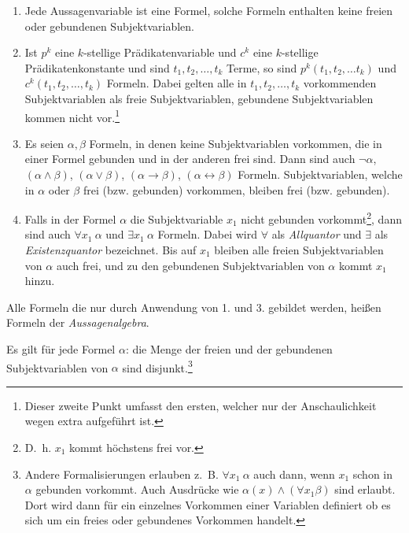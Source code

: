 \documentclass[a4paper,german,10pt,twoside]{book}
\theoremstyle{definition}
\theoremstyle{remark}
\begin{document}
\begin{enumerate}

\item Jede Aussagenvariable ist eine Formel, solche Formeln enthalten keine freien oder gebundenen Subjektvariablen. 
\item Ist $p^k$ eine $k$-stellige Pr{\"a}dikatenvariable und $c^k$ eine $k$-stellige Pr{\"a}dikatenkonstante und sind $t_1, t_2, \ldots, t_k$ Terme, so sind $p^k(t_1, t_2, \ldots t_k)$ und $c^k(t_1, t_2, \ldots, t_k)$ Formeln. Dabei gelten alle in 
$t_1, t_2, \ldots, t_k$ vorkommenden Subjektvariablen als freie Subjektvariablen, gebundene Subjektvariablen kommen nicht 
vor.\footnote{Dieser zweite Punkt umfasst den ersten, welcher nur der Anschaulichkeit wegen extra aufgef{\"u}hrt ist.} 

\item Es seien $\alpha, \beta$ Formeln, in denen keine Subjektvariablen vorkommen, die in einer Formel gebunden und in der anderen frei sind. Dann sind auch $\neg \alpha$, $(\alpha \land \beta)$, $(\alpha \lor \beta)$, $(\alpha \rightarrow \beta)$, $(\alpha \leftrightarrow \beta)$ Formeln. Subjektvariablen, welche in $\alpha$ oder $\beta$ frei (bzw. gebunden) vorkommen, bleiben frei (bzw. gebunden).

\item Falls in der Formel $\alpha$ die Subjektvariable $x_1$ nicht gebunden vorkommt\footnote{D.~h. $x_1$ kommt h{\"o}chstens frei vor.}, dann sind auch $\forall x_1~\alpha$ und $\exists x_1~\alpha$ Formeln. Dabei wird $\forall$ als
\emph{Allquantor} und $\exists$ als \emph{Existenzquantor} bezeichnet. Bis auf $x_1$ bleiben alle freien Subjektvariablen von $\alpha$ auch frei, und zu den gebundenen Subjektvariablen von $\alpha$ kommt $x_1$ hinzu. 

\end{enumerate}
Alle Formeln die nur durch Anwendung von 1. und 3. gebildet werden, hei{\ss}en Formeln der \emph{Aussagenalgebra}. 

\par
Es gilt f{\"u}r jede Formel $\alpha$: die Menge der freien und der gebundenen Subjektvariablen von $\alpha$ sind disjunkt.\footnote{Andere Formalisierungen erlauben z.~B. $\forall x_1~\alpha$ auch dann, wenn $x_1$ schon in $\alpha$ gebunden vorkommt. Auch Ausdr{\"u}cke wie $\alpha(x) \land (\forall x_1 \beta)$ sind erlaubt. Dort wird dann
f{\"u}r ein einzelnes Vorkommen einer Variablen definiert ob es sich um ein freies oder gebundenes Vorkommen handelt.}
\end{document}
